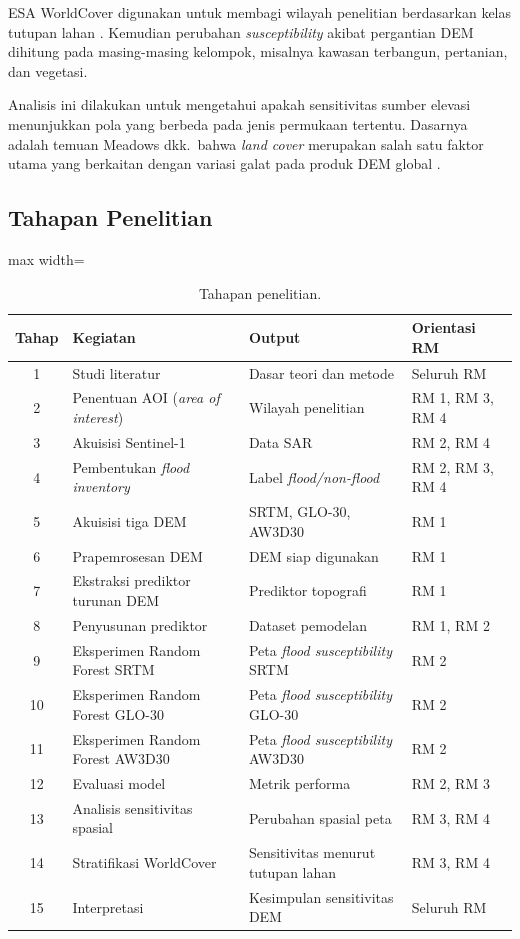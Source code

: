 \documentclass[12pt]{article}
\begin{document}
ESA WorldCover digunakan untuk membagi wilayah penelitian berdasarkan kelas
tutupan lahan \cite{zanaga2021}. Kemudian perubahan \textit{susceptibility}
akibat pergantian DEM dihitung pada masing-masing kelompok, misalnya
kawasan terbangun, pertanian, dan vegetasi.

Analisis ini dilakukan untuk mengetahui apakah sensitivitas sumber elevasi
menunjukkan pola yang berbeda pada jenis permukaan tertentu. Dasarnya adalah
temuan Meadows dkk.\ bahwa \textit{land cover} merupakan salah satu faktor
utama yang berkaitan dengan variasi galat pada produk DEM global
\cite{meadows2024}.

\subsection{Tahapan Penelitian}

\begin{table}[ht]
\centering
\caption{Tahapan penelitian.}
\label{tab:tahapan}
\begin{adjustbox}{max width=\textwidth}
\begin{tabular}{clp{5.4cm}p{4.6cm}}
\toprule
\textbf{Tahap} & \textbf{Kegiatan} & \textbf{Output} & \textbf{Orientasi RM} \\
\midrule
1 & Studi literatur & Dasar teori dan metode & Seluruh RM \\
2 & Penentuan AOI (\textit{area of interest}) & Wilayah penelitian & RM 1, RM 3, RM 4 \\
3 & Akuisisi Sentinel-1 & Data SAR & RM 2, RM 4 \\
4 & Pembentukan \textit{flood inventory} & Label \textit{flood/non-flood} & RM 2, RM 3, RM 4 \\
5 & Akuisisi tiga DEM & SRTM, GLO-30, AW3D30 & RM 1 \\
6 & Prapemrosesan DEM & DEM siap digunakan & RM 1 \\
7 & Ekstraksi prediktor turunan DEM & Prediktor topografi & RM 1 \\
8 & Penyusunan prediktor & Dataset pemodelan & RM 1, RM 2 \\
9 & Eksperimen Random Forest SRTM & Peta \textit{flood susceptibility} SRTM & RM 2 \\
10 & Eksperimen Random Forest GLO-30 & Peta \textit{flood susceptibility} GLO-30 & RM 2 \\
11 & Eksperimen Random Forest AW3D30 & Peta \textit{flood susceptibility} AW3D30 & RM 2 \\
12 & Evaluasi model & Metrik performa & RM 2, RM 3 \\
13 & Analisis sensitivitas spasial & Perubahan spasial peta & RM 3, RM 4 \\
14 & Stratifikasi WorldCover & Sensitivitas menurut tutupan lahan & RM 3, RM 4 \\
15 & Interpretasi & Kesimpulan sensitivitas DEM & Seluruh RM \\
\bottomrule
\end{tabular}
\end{adjustbox}
\end{table}
\end{document}
